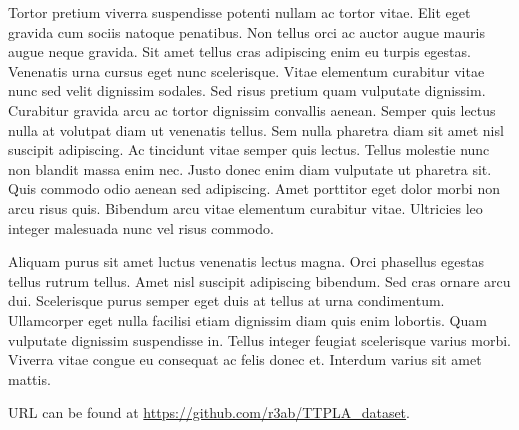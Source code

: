 Tortor pretium viverra suspendisse potenti nullam ac tortor vitae. Elit eget gravida cum sociis natoque penatibus. Non tellus orci ac auctor augue mauris augue neque gravida. Sit amet tellus cras adipiscing enim eu turpis egestas. Venenatis urna cursus eget nunc scelerisque. Vitae elementum curabitur vitae nunc sed velit dignissim sodales. Sed risus pretium quam vulputate dignissim. Curabitur gravida arcu ac tortor dignissim convallis aenean. Semper quis lectus nulla at volutpat diam ut venenatis tellus. Sem nulla pharetra diam sit amet nisl suscipit adipiscing. Ac tincidunt vitae semper quis lectus. Tellus molestie nunc non blandit massa enim nec. Justo donec enim diam vulputate ut pharetra sit. Quis commodo odio aenean sed adipiscing. Amet porttitor eget dolor morbi non arcu risus quis. Bibendum arcu vitae elementum curabitur vitae. Ultricies leo integer malesuada nunc vel risus commodo.

Aliquam purus sit amet luctus venenatis lectus magna. Orci phasellus egestas tellus rutrum tellus. Amet nisl suscipit adipiscing bibendum. Sed cras ornare arcu dui. Scelerisque purus semper eget duis at tellus at urna condimentum. Ullamcorper eget nulla facilisi etiam dignissim diam quis enim lobortis. Quam vulputate dignissim suspendisse in. Tellus integer feugiat scelerisque varius morbi. Viverra vitae congue eu consequat ac felis donec et. Interdum varius sit amet mattis.

URL can be found at \url{https://github.com/r3ab/TTPLA\_dataset}. 

